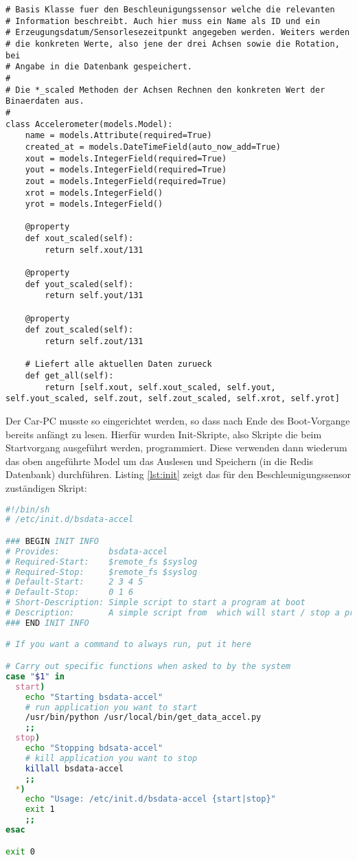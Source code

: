 \begin{lstlisting}[style=pythonstyle, caption=Sensorenmodell, label={lst:sensorsammlung}]
# Basis Klasse fuer den Beschleunigungssensor welche die relevanten 
# Information beschreibt. Auch hier muss ein Name als ID und ein 
# Erzeugungsdatum/Sensorlesezeitpunkt angegeben werden. Weiters werden
# die konkreten Werte, also jene der drei Achsen sowie die Rotation, bei
# Angabe in die Datenbank gespeichert.
# 
# Die *_scaled Methoden der Achsen Rechnen den konkreten Wert der Binaerdaten aus.
#
class Accelerometer(models.Model):
    name = models.Attribute(required=True)
    created_at = models.DateTimeField(auto_now_add=True)
    xout = models.IntegerField(required=True)
    yout = models.IntegerField(required=True)
    zout = models.IntegerField(required=True)
    xrot = models.IntegerField()
    yrot = models.IntegerField()

    @property
    def xout_scaled(self):
        return self.xout/131

    @property
    def yout_scaled(self):
        return self.yout/131

    @property
    def zout_scaled(self):
        return self.zout/131

    # Liefert alle aktuellen Daten zurueck
    def get_all(self):
        return [self.xout, self.xout_scaled, self.yout, self.yout_scaled, self.zout, self.zout_scaled, self.xrot, self.yrot]
\end{lstlisting}

Der Car-PC musste so eingerichtet werden, so dass nach Ende des Boot-Vorgange bereits anfängt zu lesen. Hierfür wurden Init-Skripte, also Skripte die beim Startvorgang ausgeführt werden, programmiert. Diese verwenden dann wiederum das oben angeführte Model um das Auslesen und Speichern (in die Redis Datenbank) durchführen. Listing \ref{lst:init} zeigt das für den Beschleunigungssensor zuständigen Skript:

\begin{lstlisting}[language=Bash, caption=Beschleunigungssensor Service, label={lst:init}]
#!/bin/sh
# /etc/init.d/bsdata-accel

### BEGIN INIT INFO
# Provides:          bsdata-accel
# Required-Start:    $remote_fs $syslog
# Required-Stop:     $remote_fs $syslog
# Default-Start:     2 3 4 5
# Default-Stop:      0 1 6
# Short-Description: Simple script to start a program at boot
# Description:       A simple script from  which will start / stop a program a boot / shutdown.
### END INIT INFO

# If you want a command to always run, put it here

# Carry out specific functions when asked to by the system
case "$1" in
  start)
    echo "Starting bsdata-accel"
    # run application you want to start
    /usr/bin/python /usr/local/bin/get_data_accel.py
    ;;
  stop)
    echo "Stopping bdsata-accel"
    # kill application you want to stop
    killall bsdata-accel
    ;;
  *)
    echo "Usage: /etc/init.d/bsdata-accel {start|stop}"
    exit 1
    ;;
esac

exit 0
\end{lstlisting}

